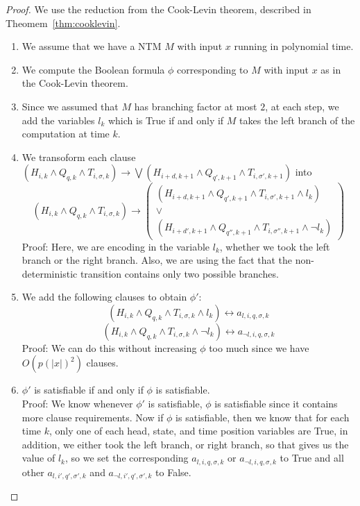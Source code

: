 \documentclass[runningheads,a4paper]{llncs}
\begin{document}
\begin{proof}
We use the reduction from the Cook-Levin theorem, described in Theomem~\ref{thm:cooklevin}.

\begin{enumerate}
\item We assume that we have a NTM $M$ with input $x$ running in polynomial time.
\item We compute the Boolean formula $\phi$ corresponding to $M$ with input $x$ as in the Cook-Levin theorem.
\item Since we assumed that $M$ has branching factor at most $2$, at each step, we add the variables $l_k$ which is True if and only if $M$ takes the left branch of the computation at time $k$.
\item We transoform each clause $(H_{i,k} \wedge Q_{q,k} \wedge T_{i, \sigma, k}) \rightarrow \bigvee (H_{i+d,k+1} \wedge Q_{q',k+1} \wedge T_{i,\sigma',k+1})$ into 
\[
 (H_{i,k} \wedge Q_{q,k} \wedge T_{i,\sigma, k}) \rightarrow \left(\begin{array}{c} (H_{i+d,k+1} \wedge Q_{q', k+1} \wedge T_{i,\sigma', k+1} \wedge l_k) \\ \vee \\ (H_{i+d',k+1} \wedge Q_{q'', k+1} \wedge T_{i,\sigma'', k+1} \wedge \neg l_k) \end{array}\right) \]
Proof: Here, we are encoding in the variable $l_k$, whether we took the left branch or the right branch. Also, we are using the fact that the non-deterministic transition contains only two possible branches.
\item We add the following clauses to obtain $\phi'$:
\[ (H_{i,k} \wedge Q_{q,k} \wedge T_{i,\sigma,k} \wedge l_k) \leftrightarrow a_{l, i, q, \sigma, k} \]
\[ (H_{i,k} \wedge Q_{q,k} \wedge T_{i,\sigma,k} \wedge \neg l_k) \leftrightarrow a_{\neg l, i, q, \sigma, k} \]
Proof: We can do this without increasing $\phi$ too much since we have $O(p(|x|)^2)$ clauses.
\item $\phi'$ is satisfiable if and only if $\phi$ is satisfiable. \\
Proof: We know whenever $\phi'$ is satisfiable, $\phi$ is satisfiable since it contains more clause requirements. Now if $\phi$ is satisfiable, then we know that for each time $k$, only one of each head, state, and time position variables are True, in addition, we either took the left branch, or right branch, so that gives us the value of $l_k$, so we set the corresponding $a_{l, i,q,\sigma,k}$ or $a_{\neg l, i, q, \sigma, k}$ to True and all other $a_{l, i', q', \sigma', k}$ and $a_{\neg l, i', q', \sigma', k}$ to False.

\end{enumerate}
\end{proof}
\end{document}

